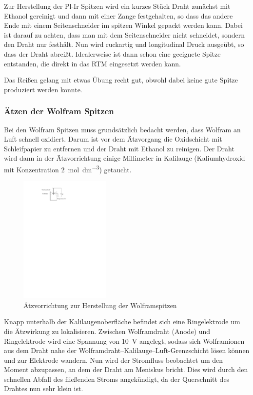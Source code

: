 \documentclass[10pt, a4paper]{article}
\begin{document}
Zur Herstellung der Pl-Ir Spitzen wird ein kurzes Stück Draht zunächst mit Ethanol gereinigt und dann mit einer Zange festgehalten, so dass das andere Ende mit einem Seitenschneider im spitzen Winkel gepackt werden kann.
Dabei ist darauf zu achten, dass man mit dem Seitenschneider nicht schneidet, sondern den Draht nur festhält.
Nun wird ruckartig und longitudinal Druck ausgeübt, so dass der Draht abreißt. Idealerweise ist dann schon eine geeignete Spitze entstanden, die direkt in das RTM eingesetzt werden kann.

Das Reißen gelang mit etwas Übung recht gut, obwohl dabei keine gute Spitze produziert werden konnte.

\subsubsection{Ätzen der Wolfram Spitzen}
Bei den Wolfram Spitzen muss grundsätzlich bedacht werden, dass Wolfram an Luft schnell oxidiert. 
Darum ist vor dem Ätzvorgang die Oxidschicht mit Schleifpapier zu entfernen und  der Draht mit Ethanol zu reinigen.
Der Draht wird dann in der Ätzvorrichtung einige Millimeter in Kalilauge (Kaliumhydroxid mit Konzentration \SI{2}{\mol\per\cubic\deci\metre}) getaucht.
\begin{figure}[h]
\centering
\includegraphics[width=0.4\textwidth]{./grafiken/aetzvorrichtung.pdf}
\caption{Ätzvorrichtung zur Herstellung der Wolframspitzen}
\label{fig:aetzen}
\end{figure}
Knapp unterhalb der Kalilaugenoberfläche befindet sich eine Ringelektrode um die Ätzwirkung zu lokalisieren.
Zwischen Wolframdraht (Anode) und Ringelektrode wird eine Spannung von \SI{10}{\volt} angelegt, sodass sich Wolframionen aus dem Draht nahe der Wolframdraht--Kalilauge--Luft-Grenzschicht lösen können und zur Elektrode wandern.
Nun wird der Stromfluss beobachtet um den Moment abzupassen, an dem der Draht am Meniskus bricht.
Dies wird durch den schnellen Abfall des fließenden Stroms angekündigt, da der Querschnitt des Drahtes nun sehr klein ist.
\end{document}
